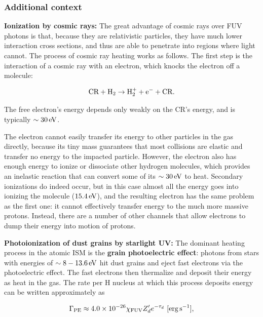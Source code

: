 \documentclass[a4paper,10pt]{article}
\begin{document}
\subsubsection{Additional context}

{\noindent}\textbf{Ionization by cosmic rays:} The great advantage of cosmic rays over FUV photons is that, because they are relativistic particles, they have much lower interaction cross sections, and thus are able to penetrate into regions where light cannot. The process of cosmic ray heating works as follows. The first step is the interaction of a cosmic ray with an electron, which knocks the electron off a molecule:

\begin{align*}
    {\rm CR + H_2 \rightarrow H_2^+ + e^- + CR}.
\end{align*}

{\noindent}The free electron's energy depends only weakly on the CR's energy, and is typically $\sim30\,{\rm eV}$.

{\noindent}The electron cannot easily transfer its energy to other particles in the gas directly, because its tiny mass guarantees that most collisions are elastic and transfer no energy to the impacted particle. However, the electron also has enough energy to ionize or dissociate other hydrogen molecules, which provides an inelastic reaction that can convert some of its $\sim30\,{\rm eV}$ to heat. Secondary ionizations do indeed occur, but in this case almost all the energy goes into ionizing the molecule ($15.4\,{\rm eV}$), and the resulting electron has the same problem as the first one: it cannot effectively transfer energy to the much more massive protons. Instead, there are a number of other channels that allow electrons to dump their energy into motion of protons.

{\noindent}\textbf{Photoionization of dust grains by starlight UV:} The dominant heating process in the atomic ISM is the \textbf{grain photoelectric effect}: photons from stars with energies of $\sim8-13.6\,{\rm eV}$ hit dust grains and eject fast electrons via the photoelectric effect. The fast electrons then thermalize and deposit their energy as heat in the gas. The rate per H nucleus at which this process deposits energy can be written approximately as

\begin{align*}
    \Gamma_{\rm PE} \approx 4.0\times10^{-26}\chi_{\rm FUV}Z_d'e^{-\tau_d} ~ [{\rm erg\,s^{-1}}],
\end{align*}
\end{document}
